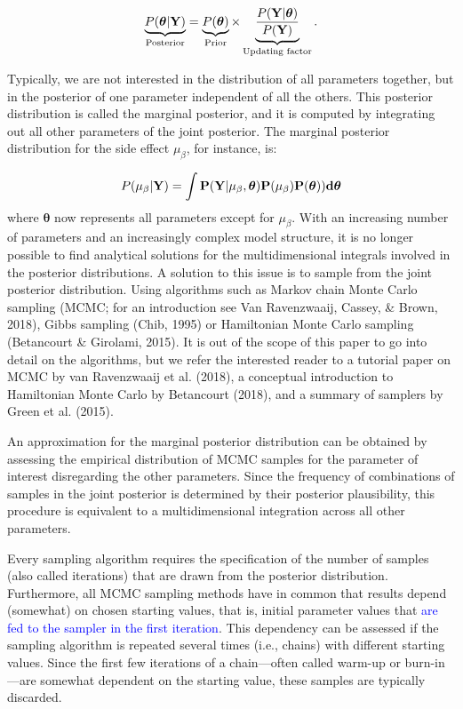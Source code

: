 \documentclass[
  english,
  doc,floatsintext]{apa6}
\begin{document}
\begin{equation}
\underbrace{P(\bm{\theta}|\bf{Y})}_{\text{Posterior}} = \underbrace{P(\bm{\theta})}_{\text{Prior}}\times\underbrace{\frac{P(\bf{Y}|\bm{\theta})}{P(\bf{Y})}}_{\text{Updating factor}}.
\label{eq:Bayesrule}
\end{equation}

Typically, we are not interested in the distribution of all parameters together, but in the posterior of one parameter independent of all the others. This posterior distribution is called the marginal posterior, and it is computed by integrating out all other parameters of the joint posterior. The marginal posterior distribution for the side effect \(\mu_{\beta}\), for instance, is:

\begin{equation}
P(\mu_{\beta}| \bf{Y}) = \int P(\bf{Y} | \mu_{\beta}, \bm{\theta})P(\mu_{\beta})P(\bm{\theta})) d\bm{\theta}  
\end{equation}
where \(\bm{\theta}\) now represents all parameters except for \(\mu_{\beta}\). With an increasing number of parameters and an increasingly complex model structure, it is no longer possible to find analytical solutions for the multidimensional integrals involved in the posterior distributions. A solution to this issue is to sample from the joint posterior distribution. Using algorithms such as Markov chain Monte Carlo sampling (MCMC; for an introduction see Van Ravenzwaaij, Cassey, \& Brown, 2018), Gibbs sampling (Chib, 1995) or Hamiltonian Monte Carlo sampling (Betancourt \& Girolami, 2015). It is out of the scope of this paper to go into detail on the algorithms, but we refer the interested reader to a tutorial paper on MCMC by van Ravenzwaaij et al. (2018), a conceptual introduction to Hamiltonian Monte Carlo by Betancourt (2018), and a summary of samplers by Green et al. (2015).

An approximation for the marginal posterior distribution can be obtained by assessing the empirical distribution of MCMC samples for the parameter of interest disregarding the other parameters. Since the frequency of combinations of samples in the joint posterior is determined by their posterior plausibility, this procedure is equivalent to a multidimensional integration across all other parameters.

Every sampling algorithm requires the specification of the number of samples (also called iterations) that are drawn from the posterior distribution. Furthermore, all MCMC sampling methods have in common that results depend (somewhat) on chosen starting values, that is, initial parameter values that \textcolor{blue}{are fed to the sampler in the first iteration}. This dependency can be assessed if the sampling algorithm is repeated several times (i.e., chains) with different starting values. Since the first few iterations of a chain---often called warm-up or burn-in---are somewhat dependent on the starting value, these samples are typically discarded.
\end{document}
